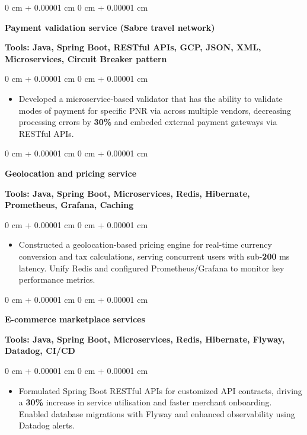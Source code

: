 \documentclass[10pt, letterpaper]{article}
\newenvironment{highlights}{
    \begin{itemize}[
        topsep=0.10 cm,
        parsep=0.10 cm,
        partopsep=0pt,
        itemsep=0pt,
        leftmargin=0 cm + 10pt
    ]
}{
    \end{itemize}
} %
\newenvironment{onecolentry}{
    \begin{adjustwidth}{
        0 cm + 0.00001 cm
    }{
        0 cm + 0.00001 cm
    }
}{
    \end{adjustwidth}
} %
\begin{document}
        \vspace{0.1 cm}
        \begin{onecolentry}
            \textbf{Payment validation service (Sabre travel network)}
        \end{onecolentry}
        \textbf{Tools: Java, Spring Boot, RESTful APIs, GCP, JSON, XML, Microservices, Circuit Breaker pattern}
        
        \vspace{0.10 cm}
        \begin{onecolentry}
            \begin{highlights}
                \item Developed a microservice-based validator that has the ability to validate modes of payment for specific PNR via across multiple vendors, decreasing processing errors by \textbf{30\%} and embeded external payment gateways via RESTful APIs.
            \end{highlights}
        \end{onecolentry}
        
        \vspace{0.1 cm}
        \begin{onecolentry}
            \textbf{Geolocation and pricing service}
        \end{onecolentry}
        \textbf{Tools: Java, Spring Boot, Microservices, Redis, Hibernate, Prometheus, Grafana, Caching}
        \vspace{0.10 cm}
        \begin{onecolentry}
            \begin{highlights}
                \item Constructed a geolocation-based pricing engine for real-time currency conversion and tax calculations, serving concurrent users with sub-\textbf{200} ms latency. Unify Redis and configured Prometheus/Grafana to monitor key performance metrics.
            \end{highlights}
        \end{onecolentry}

        \vspace{0.1 cm}

        \begin{onecolentry}
            \textbf{E-commerce marketplace services}
        \end{onecolentry}
        \textbf{Tools: Java, Spring Boot, Microservices, Redis, Hibernate, Flyway, Datadog, CI/CD}
        \vspace{0.10 cm}
        \begin{onecolentry}
            \begin{highlights}
                \item Formulated Spring Boot RESTful APIs for customized API contracts, driving a \textbf{30\%} increase in service utilisation and faster merchant onboarding. Enabled database migrations with Flyway and enhanced observability using Datadog alerts.
                
            \end{highlights}
        \end{onecolentry}
    
\end{document}
